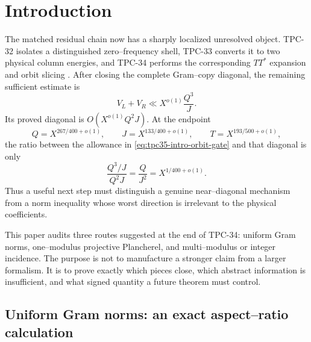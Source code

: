 \section{Introduction}
\label{sec:tpc35-introduction}

The matched residual chain now has a sharply localized unresolved object.
TPC-32 isolates a distinguished zero--frequency shell, TPC-33 converts it
to two physical column energies, and TPC-34 performs the corresponding
\(TT^*\) expansion and orbit slicing
\citep{WangTPC32,WangTPC33,WangTPC34}.  After closing the complete
Gram--copy diagonal, the remaining sufficient estimate is
\begin{equation}
 V_L+V_R\ll X^{o(1)}\frac{Q^3}{J}.
 \label{eq:tpc35-intro-orbit-gate}
\end{equation}
Its proved diagonal is \(O(X^{o(1)}Q^2J)\).  At the endpoint
\begin{equation}
 Q=X^{267/400+o(1)},\qquad
 J=X^{133/400+o(1)},\qquad
 T=X^{193/500+o(1)},
 \label{eq:tpc35-intro-scales}
\end{equation}
the ratio between the allowance in \eqref{eq:tpc35-intro-orbit-gate}
and that diagonal is only
\begin{equation}
 \frac{Q^3/J}{Q^2J}=\frac{Q}{J^2}
 =X^{1/400+o(1)}.
 \label{eq:tpc35-intro-margin}
\end{equation}
Thus a useful next step must distinguish a genuine near--diagonal
mechanism from a norm inequality whose worst direction is irrelevant to
the physical coefficients.

This paper audits three routes suggested at the end of TPC-34:
uniform Gram norms, one--modulus projective Plancherel, and multi--modulus
or integer incidence.  The purpose is not to manufacture a stronger
claim from a larger formalism.  It is to prove exactly which pieces close,
which abstract information is insufficient, and what signed quantity a
future theorem must control.

\subsection{Uniform Gram norms: an exact aspect--ratio calculation}

